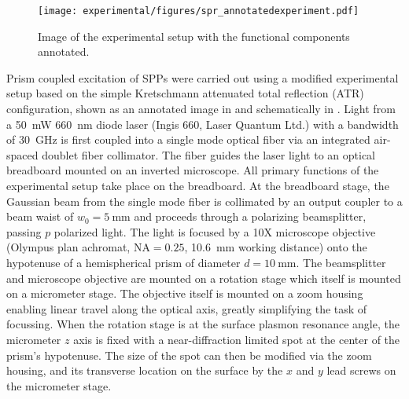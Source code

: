 \begin{figure}[ht]
 \centering
 \texttt{[image: experimental/figures/spr\_annotatedexperiment.pdf]}
 \caption{Image of the experimental setup with the functional
  components annotated.}
\label{fig:experimentalpicture}
\end{figure}

Prism coupled excitation of SPPs were carried out using a modified
experimental setup based on the simple Kretschmann attenuated total reflection
(ATR) configuration, shown as an annotated image in
 and schematically in
.  Light from a \SI{50}{\milli\watt}
\SI{660}{\nano\meter} diode laser (Ingis 660, Laser Quantum Ltd.) with a
bandwidth of \SI{30}{\giga\hertz} is first coupled into a single mode optical
fiber via an integrated air-spaced doublet fiber collimator.  The fiber guides
the laser light to an optical breadboard mounted on an inverted microscope.
All primary functions of the experimental setup take place on the breadboard.
At the breadboard stage, the Gaussian beam from the single mode fiber is
collimated by an output coupler to a beam waist of $w_0=\SI{5}{\milli\meter}$
and proceeds through a polarizing beamsplitter, passing $p$ polarized light.
The light is focused by a 10X microscope objective (Olympus plan achromat,
$\mathrm{NA}=0.25$, \SI{10.6}{\milli\meter} working distance) onto the
hypotenuse of a hemispherical prism of diameter $d=\SI{10}{\milli\meter}$.
The beamsplitter and microscope objective are mounted on a rotation stage
which itself is mounted on a micrometer stage.  The objective itself is
mounted on a zoom housing enabling linear travel along the optical axis,
greatly simplifying the task of focussing.  When the rotation stage is at the
surface plasmon resonance angle, the micrometer $z$ axis is fixed with a
near-diffraction limited spot at the center of the prism's hypotenuse.  The
size of the spot can then be modified via the zoom housing, and its transverse
location on the surface by the $x$ and $y$ lead screws on the micrometer
stage.  

